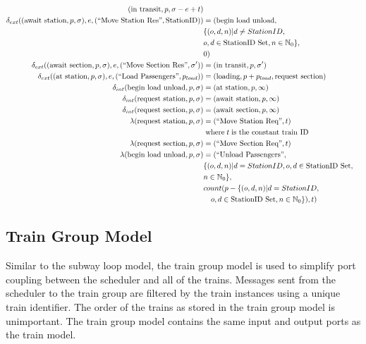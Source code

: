 \begin{align*}
        (\text{in transit}, p, \sigma - e + t) \\
    \delta_{ext}((\text{await station}, p, \sigma), e, (\text{``Move Station Res''}, \text{StationID})) &= (\text{begin load unload}, \\
        & \{ (o, d, n) | d \neq StationID, \\
        & o, d \in \text{StationID Set}, n \in \mathbb{N}_0 \}, \\
        & 0) \\
    \delta_{ext}((\text{await section}, p, \sigma), e, (\text{``Move Section Res''}, \sigma')) &= (\text{in transit}, p, \sigma') \\
    \delta_{ext}((\text{at station}, p, \sigma), e, (\text{``Load Passengers''}, p_{load})) &=
        (\text{loading}, p + p_{load}, \text{request section}) \\
    \delta_{int}(\text{begin load unload}, p, \sigma) &= 
        (\text{at station}, p, \infty) \\
    \delta_{int}(\text{request station}, p, \sigma) &= 
        (\text{await station}, p, \infty) \\
    \delta_{int}(\text{request section}, p, \sigma) &= 
        (\text{await section}, p, \infty) \\
    \lambda(\text{request station}, p, \sigma) &= (\text{``Move Station Req''}, t) \\ 
        & \text{\;where\;} t \text{\;is the constant train ID} \\
    \lambda(\text{request section}, p, \sigma) &= (\text{``Move Section Req''}, t) \\ 
    \lambda(\text{begin load unload}, p, \sigma) &= (\text{``Unload Passengers''},  \\
        & \{ (o, d, n) | d = StationID, o, d \in \text{StationID Set}, \\
        & n \in \mathbb{N}_0 \}, \\ 
        & count(p - \{ (o, d, n) | d = StationID, \\
        & \quad o, d \in \text{StationID Set}, n \in \mathbb{N}_0 \}), t)
\end{align*}
%
\subsection{Train Group Model}
Similar to the subway loop model, the train group model is used to simplify port coupling between the scheduler and all of the trains.  Messages sent from the scheduler to the train group are filtered by the train instances using a unique train identifier.  The order of the trains as stored in the train group model is unimportant.  The train group model contains the same input and output ports as the train model.

